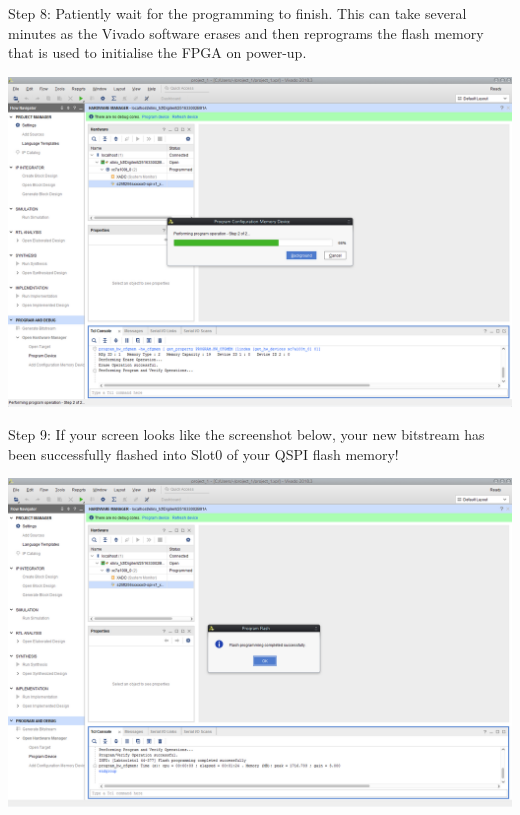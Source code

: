 \begin{minipage}{\linewidth}
  Step 8: Patiently wait for the programming to finish.
  This can take several minutes as the Vivado software erases
  and then reprograms the flash memory that is used to
  initialise the FPGA on power-up.
  \\
  \begin{center}
    \includegraphics[width=0.85\linewidth]{images/vivado08.png}
  \end{center}
\end{minipage}


\begin{minipage}{\linewidth}
Step 9: If your screen looks like the screenshot below,
your new bitstream has been successfully flashed into Slot0 of your QSPI flash memory!
  \\
  \begin{center}
    \includegraphics[width=0.8\linewidth]{images/vivado09.png}
  \end{center}
\end{minipage}

\vspace{5mm}

